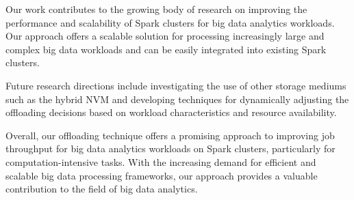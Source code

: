 \documentclass[twocolumn,10pt]{asme2e}
\begin{document}
Our work contributes to the growing body of research on improving the performance and scalability of Spark clusters for big data analytics workloads. Our approach offers a scalable solution for processing increasingly large and complex big data workloads and can be easily integrated into existing Spark clusters.

Future research directions include investigating the use of other storage mediums such as the hybrid NVM and developing techniques for dynamically adjusting the offloading decisions based on workload characteristics and resource availability.

Overall, our offloading technique offers a promising approach to improving job throughput for big data analytics workloads on Spark clusters, particularly for computation-intensive tasks. With the increasing demand for efficient and scalable big data processing frameworks, our approach provides a valuable contribution to the field of big data analytics.




\begin{acknowledgment}
\end{acknowledgment}

%



\nocite{*}
\end{document}
